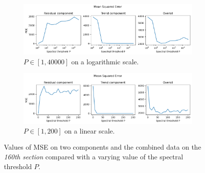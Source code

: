 \begin{figure}
	\begin{subfigure}{\textwidth}
		\includegraphics[width=\textwidth,keepaspectratio]{img/p_adjust_log.png}
		\caption{$P\in[1,40000]$ on a logarithmic scale.}
	\end{subfigure}
	\begin{subfigure}{\textwidth}
		\includegraphics[width=\textwidth,keepaspectratio]{img/p_adjust_200.png}
		\caption{$P\in[1,200]$ on a linear scale.}
	\end{subfigure}
	\centering
	\caption{Values of MSE on two components and the combined data on the
	\textit{160th section} compared with a varying value of the spectral
	threshold $P$.}
	\label{fig:p_adjust}
\end{figure}

